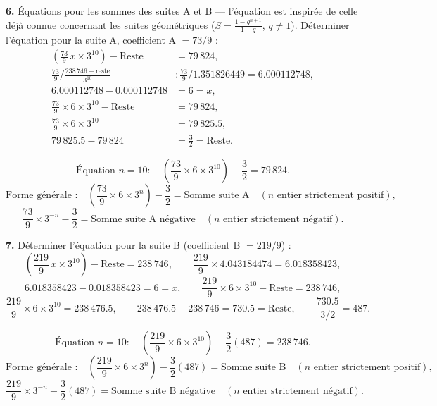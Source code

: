 \documentclass[11pt,a4paper]{article}
\begin{document}
\textbf{6.} Équations pour les sommes des suites A et B --- l'équation est
inspirée de celle déjà connue concernant les suites géométriques
($S = \frac{1-q^{n+1}}{1-q}$, $q \neq 1$). Déterminer l'équation pour la
suite A, coefficient A $= 73/9$ :
\begin{align*}
\left(\frac{73}{9}\,x \times 3^{10}\right)-\text{Reste} &= 79\,824,\\
\frac{73}{9}\Big/\frac{238\,746+\text{reste}}{3^{10}}
&\colon \frac{73}{9}/1.351826449 = 6.000112748,\\
6.000112748-0.000112748 &= 6=x,\\
\frac{73}{9}\times6\times3^{10}-\text{Reste} &= 79\,824,\\
\frac{73}{9}\times6\times3^{10} &= 79\,825.5,\\
79\,825.5-79\,824 &= \frac{3}{2}=\text{Reste}.
\end{align*}

\begin{boiteformule}
\[
\text{Équation } n=10 :\quad \left(\frac{73}{9}\times 6 \times 3^{10}\right) - \frac{3}{2} = 79\,824.
\]
\[
\text{Forme générale :}\quad \left(\frac{73}{9}\times 6 \times 3^{n}\right) - \frac{3}{2} = \text{Somme suite A}
\quad (n \text{ entier strictement positif}),
\]
\[
\frac{73}{9}\times 3^{-n} - \frac{3}{2} = \text{Somme suite A négative}
\quad (n \text{ entier strictement négatif}).
\]
\end{boiteformule}

\textbf{7.} Déterminer l'équation pour la suite B (coefficient B $= 219/9$) :
\[
\left(\frac{219}{9}\, x \times 3^{10}\right) - \text{Reste} = 238\,746,
\qquad
\frac{219}{9}\times 4.043184474 = 6.018358423,
\]
\[
6.018358423 - 0.018358423 = 6 = x,
\qquad
\frac{219}{9}\times 6 \times 3^{10} - \text{Reste} = 238\,746,
\]
\[
\frac{219}{9}\times 6 \times 3^{10} = 238\,476.5,
\qquad
238\,476.5 - 238\,746 = 730.5 = \text{Reste},
\qquad
\frac{730.5}{3/2} = 487.
\]

\begin{boiteformule}
\[
\text{Équation } n=10 :\quad \left(\frac{219}{9}\times 6 \times 3^{10}\right) - \frac{3}{2}(487) = 238\,746.
\]
\[
\text{Forme générale :}\quad \left(\frac{219}{9}\times 6 \times 3^{n}\right) - \frac{3}{2}(487) = \text{Somme suite B}
\quad (n \text{ entier strictement positif}),
\]
\[
\frac{219}{9}\times 3^{-n} - \frac{3}{2}(487) = \text{Somme suite B négative}
\quad (n \text{ entier strictement négatif}).
\]
\end{boiteformule}
\end{document}
